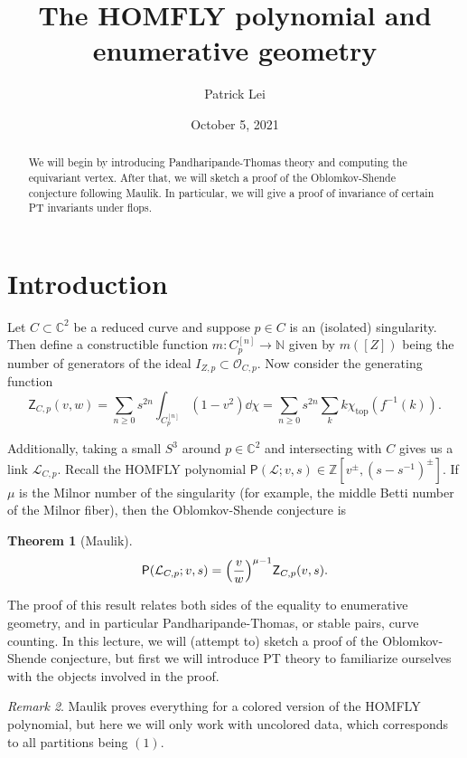 \documentclass{amsart}
\title{The HOMFLY polynomial and enumerative geometry}
\author{Patrick Lei}
\date{October 5, 2021}
\newtheorem{thm}{Theorem}[section]
\theoremstyle{definition}
\theoremstyle{remark}
\newtheorem{rmk}[thm]{Remark}
\theoremstyle{plain}
\theoremstyle{definition}
\theoremstyle{remark}
\newcommand{\N}{\mathbb{N}}
\newcommand{\C}{\mathbb{C}}
\newcommand{\Z}{\mathbb{Z}}
\newcommand{\mc}[1]{\mathcal{#1}}
\newcommand{\mr}[1]{\mathrm{#1}}
\newcommand{\ms}[1]{\mathsf{#1}}
\newcommand{\1}{\mathbf{1}}
\newcommand{\2}{\mathbf{2}}
\newcommand{\3}{\mathbf{3}}
\begin{document}
    
\maketitle

\begin{abstract}
    We will begin by introducing Pandharipande-Thomas theory and computing the equivariant vertex. After that, we will sketch a proof of the Oblomkov-Shende conjecture following Maulik. In particular, we will give a proof of invariance of certain PT invariants under flops.
\end{abstract}

\section{Introduction}%
\label{sec:introduction}

Let $C \subset \C^2$ be a reduced curve and suppose $p \in C$ is an (isolated) singularity. Then define a constructible function $m \colon C_p^{[n]} \to \N$ given by $m([Z])$ being the number of generators of the ideal $I_{Z,p} \subset \mc{O}_{C,p}$. Now consider the generating function
\[ \ms{Z}_{C,p}(v, w) = \sum_{n \geq 0} s^{2n} \int_{C_p^{[n]}} (1-v^2) \dd{\chi} = \sum_{n \geq 0} s^{2n} \sum_k k \chi_{\mr{top}}(f^{-1}(k)). \]

Additionally, taking a small $S^3$ around $p \in \C^2$ and intersecting with $C$ gives us a link $\mc{L}_{C,p}$. Recall the HOMFLY polynomial $\ms{P}(\mc{L}; v, s) \in \Z[v^{\pm}, {(s-s^{-1})}^{\pm}]$. If $\mu$ is the Milnor number of the singularity (for example, the middle Betti number of the Milnor fiber), then the Oblomkov-Shende conjecture is
\begin{thm}[Maulik]
    \[ \ms{P}(\mc{L}_{C,p}; v,s) = {\qty(\frac{v}{w})}^{\mu - 1} \ms{Z}_{C,p}(v,s). \]
\end{thm}

The proof of this result relates both sides of the equality to enumerative geometry, and in particular Pandharipande-Thomas, or stable pairs, curve counting. In this lecture, we will (attempt to) sketch a proof of the Oblomkov-Shende conjecture, but first we will introduce PT theory to familiarize ourselves with the objects involved in the proof.

\begin{rmk}
    Maulik proves everything for a colored version of the HOMFLY polynomial, but here we will only work with uncolored data, which corresponds to all partitions being $(1)$.
\end{rmk}
\end{document}
